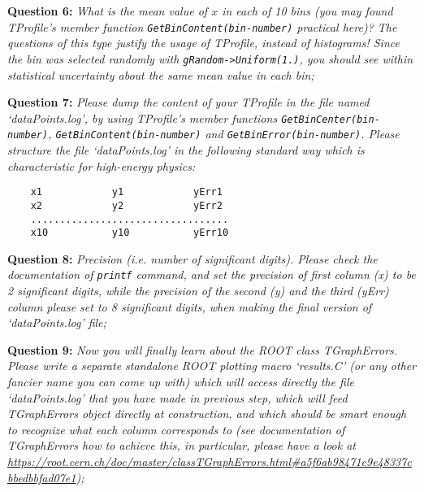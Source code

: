 \documentclass[11pt]{article}
\begin{document}
\bigskip

\noindent\textbf{Question 6:} {\it What is the mean value of $x$ in each of 10 bins (you may found TProfile's member function \verb|GetBinContent(bin-number)| practical here)? The questions of this type justify the usage of TProfile, instead of histograms! Since the bin was selected randomly with \verb|gRandom->Uniform(1.)|, you should see within statistical uncertainty about the same mean value in each bin;} 

\bigskip

\noindent\textbf{Question 7:} {\it Please dump the content of your TProfile in the file named `dataPoints.log', by using TProfile's member functions \verb|GetBinCenter(bin-number)|, \verb|GetBinContent(bin-number)| and \verb|GetBinError(bin-number)|. Please structure the file `dataPoints.log' in the following standard way which is characteristic for high-energy physics:} 
{\small
\begin{verbatim}
    x1            y1            yErr1
    x2            y2            yErr2
    ..................................
    x10           y10           yErr10
\end{verbatim}
}

\bigskip

\noindent\textbf{Question 8:} {\it Precision (i.e. number of significant digits). Please check the documentation of \verb|printf| command, and set the precision of first column (x) to be 2 significant digits, while the precision of the second (y) and the third (yErr) column please set to 8 significant digits, when making the final version of `dataPoints.log' file;}

\bigskip

\noindent\textbf{Question 9:} {\it Now you will finally learn about the ROOT class TGraphErrors. Please write a separate standalone ROOT plotting macro `results.C' (or any other fancier name you can come up with) which will access directly the file `dataPoints.log' that you have made in previous step, which will feed TGraphErrors object directly at construction, and which should be smart enough to recognize what each column corresponds to (see documentation of TGraphErrors how to achieve this, in particular, please have a look at \url{https://root.cern.ch/doc/master/classTGraphErrors.html#a5f6ab98471c9e48337cbbedbbfad07e1}); }
\end{document}
